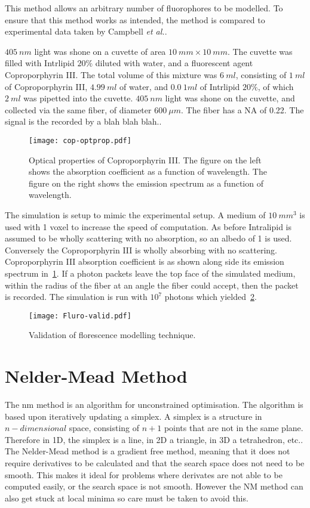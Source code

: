 This method allows an arbitrary number of fluorophores to be modelled.
To ensure that this method works as intended, the method is compared to experimental data taken by Campbell \textit{et al.}.

$405~nm$ light was shone on a cuvette of area $10~mm \times 10~mm$.
The cuvette was filled with Intrlipid $20\%$ diluted with water, and a fluorescent agent Coproporphyrin III.
The total volume of this mixture was $6~ml$, consisting of $1~ml$ of Coproporphyrin III, $4.99~ml$ of water, and $0.0~1ml$ of Intrlipid $20\%$, of which $2~ml$ was pipetted into the cuvette.
$405~nm$ light was shone on the cuvette, and collected via the same fiber, of diameter $600~\mu m$.
The fiber has a NA of 0.22.
The signal is the recorded by a blah blah blah..

\begin{figure}[!htpb]
	\centering
	\texttt{[image: cop-optprop.pdf]}
	\caption{Optical properties of Coproporphyrin III. The figure on the left shows the absorption coefficient as a function of wavelength. The figure on the right shows the emission spectrum as a function of wavelength.}
	\label{fig:coporiii}
\end{figure}

The simulation is setup to mimic the experimental setup.
A medium of $10~mm^3$ is used with 1 voxel to increase the speed of computation.
As before Intralipid is assumed to be wholly scattering with no absorption, so an albedo of 1 is used.
Conversely the Coproporphyrin III is wholly absorbing with no scattering.
Coproporphyrin III absorption coefficient is as shown along side its emission spectrum in~\cref{fig:coporiii}.
If a photon packets leave the top face of the simulated medium, within the radius of the fiber at an angle the fiber could accept, then the packet is recorded.
The simulation is run with $10^7$ photons which yielded~\cref{fig:flurovalid}.

\begin{figure}[!htpb]
  \centering
  \texttt{[image: Fluro-valid.pdf]}
  \caption{Validation of florescence modelling technique.}
  \label{fig:flurovalid}
\end{figure}

\FloatBarrier

\section{Nelder-Mead Method}

The \gls*{nm} method is an algorithm for unconstrained optimisation. 
The algorithm is based upon iteratively updating a simplex. 
A simplex is a structure in $n-dimensional$ space, consisting of $n+1$ points that are not in the same plane. 
Therefore in 1D, the simplex is a line, in 2D a triangle, in 3D a tetrahedron, etc.. 
The Nelder-Mead method is a gradient free method, meaning that it does not require derivatives to be calculated and that the search space does not need to be smooth.
This makes it ideal for problems where derivates are not able to be computed easily, or the search space is not smooth.
However the NM method can also get stuck at local minima so care must be taken to avoid this.

